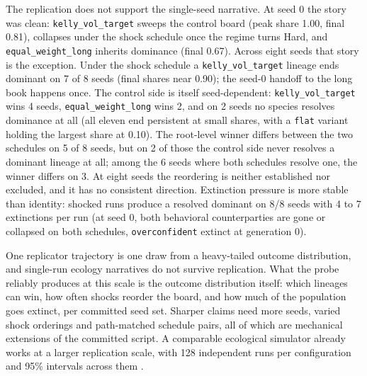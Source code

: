 The replication does not support the single-seed narrative. At seed 0 the story was clean: \texttt{kelly\_vol\_target} sweeps the control board (peak share 1.00, final 0.81), collapses under the shock schedule once the regime turns Hard, and \texttt{equal\_weight\_long} inherits dominance (final 0.67). Across eight seeds that story is the exception. Under the shock schedule a \texttt{kelly\_vol\_target} lineage ends dominant on 7 of 8 seeds (final shares near 0.90); the seed-0 handoff to the long book happens once. The control side is itself seed-dependent: \texttt{kelly\_vol\_target} wins 4 seeds, \texttt{equal\_weight\_long} wins 2, and on 2 seeds no species resolves dominance at all (all eleven end persistent at small shares, with a \texttt{flat} variant holding the largest share at 0.10). The root-level winner differs between the two schedules on 5 of 8 seeds, but on 2 of those the control side never resolves a dominant lineage at all; among the 6 seeds where both schedules resolve one, the winner differs on 3. At eight seeds the reordering is neither established nor excluded, and it has no consistent direction. Extinction pressure is more stable than identity: shocked runs produce a resolved dominant on 8/8 seeds with 4 to 7 extinctions per run (at seed 0, both behavioral counterparties are gone or collapsed on both schedules, \texttt{overconfident} extinct at generation 0).

One replicator trajectory is one draw from a heavy-tailed outcome distribution, and single-run ecology narratives do not survive replication. What the probe reliably produces at this scale is the outcome distribution itself: which lineages can win, how often shocks reorder the board, and how much of the population goes extinct, per committed seed set. Sharper claims need more seeds, varied shock orderings and path-matched schedule pairs, all of which are mechanical extensions of the committed script. A comparable ecological simulator already works at a larger replication scale, with 128 independent runs per configuration and 95\% intervals across them \citep[pp.~4, 9]{zou2026finevo}.

